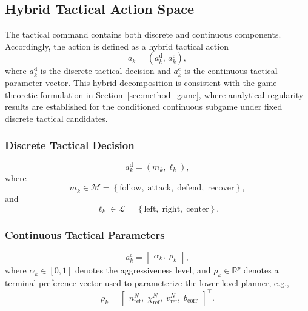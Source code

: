 \documentclass[final ,3p, times]{elsarticle}
\begin{document}
\subsection{Hybrid Tactical Action Space}
\label{subsec:hybrid_action_space}


The tactical command contains both discrete and continuous components. Accordingly, the action is defined as a hybrid tactical action
\begin{equation}
a_k =
\left(
a_k^{\mathrm{d}},\, a_k^{\mathrm{c}}
\right),
\label{eq:hybrid_action}
\end{equation}
where $a_k^{\mathrm{d}}$ is the discrete tactical decision and $a_k^{\mathrm{c}}$ is the continuous tactical parameter vector. This hybrid decomposition is consistent with the game-theoretic formulation in Section~\ref{sec:method_game}, where analytical regularity results are established for the conditioned continuous subgame under fixed discrete tactical candidates.




\subsubsection{Discrete Tactical Decision}

\begin{equation}
a_k^{\mathrm{d}}
=
\left(
m_k,\ell_k
\right),
\label{eq:discrete_action}
\end{equation}
where
\begin{equation}
m_k \in \mathcal{M}
=
\left\{
\mathrm{follow},\;
\mathrm{attack},\;
\mathrm{defend},\;
\mathrm{recover}
\right\},
\label{eq:tactical_mode_set}
\end{equation}
and
\begin{equation}
\ell_k \in \mathcal{L}
=
\left\{
\mathrm{left},\;
\mathrm{right},\;
\mathrm{center}
\right\}.
\label{eq:lateral_intent_set}
\end{equation}

\subsubsection{Continuous Tactical Parameters}

\begin{equation}
a_k^{\mathrm{c}}
=
\begin{bmatrix}
\alpha_k,\;
\rho_k
\end{bmatrix},
\label{eq:continuous_action}
\end{equation}
where $\alpha_k\in[0,1]$ denotes the aggressiveness level, and $\rho_k\in\mathbb{R}^{p}$ denotes a terminal-preference vector used to parameterize the lower-level planner, e.g.,
\begin{equation}
\rho_k=
\begin{bmatrix}
n_{\mathrm{ref}}^{N},\;
\chi_{\mathrm{ref}}^{N},\;
v_{\mathrm{ref}}^{N},\;
b_{\mathrm{corr}}
\end{bmatrix}^{\!\top}.
\label{eq:terminal_preference_vector}
\end{equation}
\end{document}

